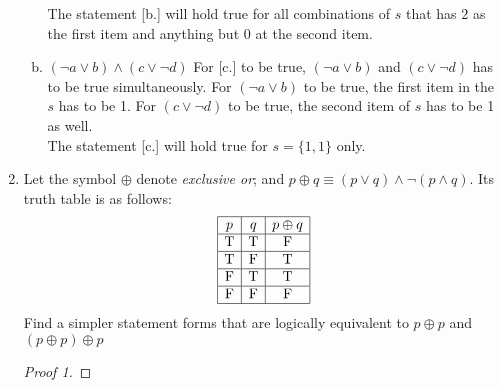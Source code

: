 \documentclass[12pt]{article}
\begin{document}
\begin{enumerate}
\begin{enumerate}[a.]
                The statement [b.] will hold true for all combinations of $s$ that has $2$ as the first item and anything but $0$ at the second item.\\
            \item $(\neg a \vee b)\wedge (c \vee \neg d)$
                For [c.] to be true, $(\neg a \vee b)$ and $(c \vee \neg d)$ has to be true simultaneously. For $(\neg a \vee b)$ to be true, the first item in the $s$ has to be 1. For $(c \vee \neg d)$ to be true, the second item of $s$ has to be 1 as well.\\
                The statement [c.] will hold true for $s = \{1,1\}$ only. 
            
        \end{enumerate}
        \newpage
    \item Let the symbol $\oplus$ denote \textit{exclusive or}; and $ p \oplus q \equiv (p \vee q ) \wedge \neg (p \wedge q)$. Its truth table is as follows:
        \[
            \begin{array}{|c|c|c|}
            \hline
            p & q & p \oplus q \\
            \hline
            \text{T} & \text{T} & \text{F} \\
            \hline
            \text{T} & \text{F} & \text{T} \\
            \hline
            \text{F} & \text{T} & \text{T} \\
            \hline
            \text{F} & \text{F} & \text{F} \\
            \hline
            \end{array}
        \]
        Find a simpler statement forms that are logically equivalent to $p \oplus p$ and $(p \oplus p) \oplus p$\\
        \begin{proof}[Proof 1]
        

\end{proof}
\end{enumerate}
\end{document}
